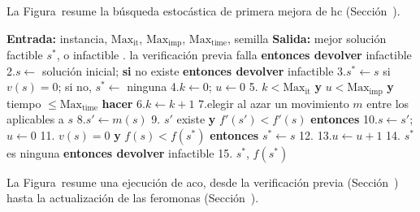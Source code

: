 \startchapter[title={Pseudocódigos}, reference=Anexo_Pseudocodigos]

\startsection[title={Hill Climbing}, reference=sec:pseudo_hc]

La Figura~ resume la búsqueda estocástica de primera
mejora de \ac{hc} (Sección~).

\startplacefigure[title={Pseudocódigo de la búsqueda estocástica de primera mejora.}, reference=fig:hc_pseudocodigo]
\startframedtext[width=broad, frame=on, align=flushleft]
\startlines
{\bf Entrada:} instancia, $\text{Max}_{\text{it}}$, $\text{Max}_{\text{imp}}$, $\text{Max}_{\text{time}}$, semilla
{\bf Salida:} mejor solución factible $s^*$, o infactible
. la verificación previa falla {\bf entonces devolver} infactible
2.\quad $s \leftarrow$ solución inicial; {\bf si} no existe {\bf entonces devolver} infactible
3.\quad $s^* \leftarrow s$ si $v(s) = 0$; si no, $s^* \leftarrow$ ninguna
4.\quad $k \leftarrow 0$;\; $u \leftarrow 0$
5. $k < \text{Max}_{\text{it}}$ {\bf y} $u < \text{Max}_{\text{imp}}$ {\bf y} tiempo $\leq \text{Max}_{\text{time}}$ {\bf hacer}
6.\quad\qquad $k \leftarrow k + 1$
7.\quad\qquad elegir al azar un movimiento $m$ entre los aplicables a $s$
8.\quad\qquad $s' \leftarrow m(s)$
9.\quad{} $s'$ existe {\bf y} $f'(s') < f'(s)$ {\bf entonces}
10.\quad\qquad\qquad $s \leftarrow s'$;\; $u \leftarrow 0$
11.\quad\qquad{} $v(s) = 0$ {\bf y} $f(s) < f(s^*)$ {\bf entonces} $s^* \leftarrow s$
12.\quad{}
13.\quad\qquad\qquad $u \leftarrow u + 1$
14. $s^*$ es ninguna {\bf entonces devolver} infactible
15. $s^*$, $f(s^*)$
\stoplines
\stopframedtext
\stopplacefigure

\stopsection

\startsection[title={Ant Colony Optimization}, reference=sec:pseudo_aco]

La Figura~ resume una ejecución de \ac{aco}, desde la
verificación previa (Sección~) hasta la
actualización de las feromonas (Sección~).


